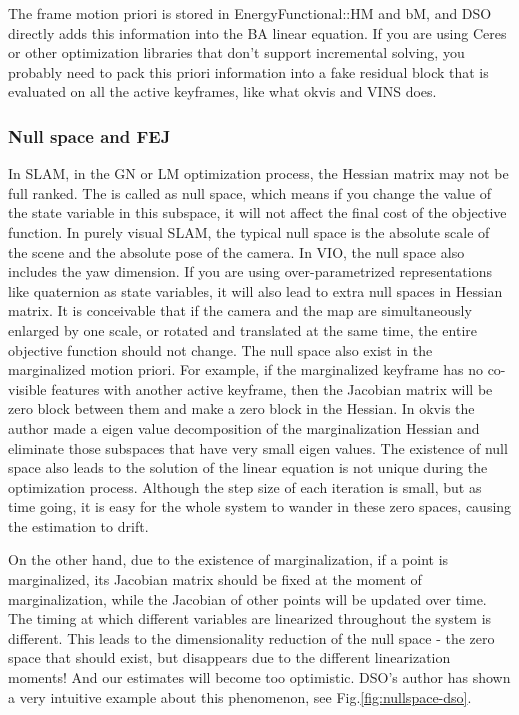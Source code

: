 \documentclass[a4paper,10pt]{article}
\begin{document}
	The frame motion priori is stored in EnergyFunctional::HM and bM, and DSO directly adds this information into the BA linear equation. If you are using Ceres or other optimization libraries that don't support incremental solving, you probably need to pack this priori information into a fake residual block that is evaluated on all the active keyframes, like what okvis \cite{leutenegger2015keyframe} and VINS \cite{qin2017vins} does.
	
	\subsubsection{Null space and FEJ}
	In SLAM, in the GN or LM optimization process, the Hessian matrix may not be full ranked. The is called as null space, which means if you change the value of the state variable in this subspace, it will not affect the final cost of the objective function. In purely visual SLAM, the typical null space is the absolute scale of the scene and the absolute pose of the camera. In VIO, the null space also includes the yaw dimension. If you are using over-parametrized representations like quaternion as state variables, it will also lead to extra null spaces in Hessian matrix. It is conceivable that if the camera and the map are simultaneously enlarged by one scale, or rotated and translated at the same time, the entire objective function should not change. The null space also exist in the marginalized motion priori. For example, if the marginalized keyframe has no co-visible features with another active keyframe, then the Jacobian matrix will be zero block between them and make a zero block in the Hessian. In okvis \cite{leutenegger2015keyframe} the author made a eigen value decomposition of the marginalization Hessian and eliminate those subspaces that have very small eigen values.  The existence of null space also leads to the solution of the linear equation is not unique during the optimization process. Although the step size of each iteration is small, but as time going, it is easy for the whole system to wander in these zero spaces, causing the estimation to drift.
	
	On the other hand, due to the existence of marginalization, if a point is marginalized, its Jacobian matrix should be fixed at the moment of marginalization, while the Jacobian of other points will be updated over time. The timing at which different variables are linearized throughout the system is different. This leads to the dimensionality reduction of the null space - the zero space that should exist, but disappears due to the different linearization moments! And our estimates will become too optimistic. DSO's author has shown a very intuitive example about this phenomenon, see Fig.\ref{fig:nullspace-dso}. 
	
\end{document}
